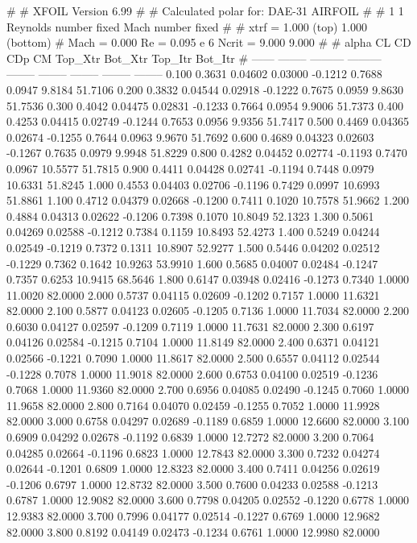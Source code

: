 #  
#       XFOIL         Version 6.99
#  
# Calculated polar for: DAE-31 AIRFOIL                                  
#  
# 1 1 Reynolds number fixed          Mach number fixed         
#  
# xtrf =   1.000 (top)        1.000 (bottom)  
# Mach =   0.000     Re =     0.095 e 6     Ncrit =   9.000  9.000
#  
#   alpha    CL        CD       CDp       CM     Top_Xtr  Bot_Xtr  Top_Itr  Bot_Itr
#  ------ -------- --------- --------- -------- -------- -------- -------- --------
   0.100   0.3631   0.04602   0.03000  -0.1212   0.7688   0.0947   9.8184  51.7106
   0.200   0.3832   0.04544   0.02918  -0.1222   0.7675   0.0959   9.8630  51.7536
   0.300   0.4042   0.04475   0.02831  -0.1233   0.7664   0.0954   9.9006  51.7373
   0.400   0.4253   0.04415   0.02749  -0.1244   0.7653   0.0956   9.9356  51.7417
   0.500   0.4469   0.04365   0.02674  -0.1255   0.7644   0.0963   9.9670  51.7692
   0.600   0.4689   0.04323   0.02603  -0.1267   0.7635   0.0979   9.9948  51.8229
   0.800   0.4282   0.04452   0.02774  -0.1193   0.7470   0.0967  10.5577  51.7815
   0.900   0.4411   0.04428   0.02741  -0.1194   0.7448   0.0979  10.6331  51.8245
   1.000   0.4553   0.04403   0.02706  -0.1196   0.7429   0.0997  10.6993  51.8861
   1.100   0.4712   0.04379   0.02668  -0.1200   0.7411   0.1020  10.7578  51.9662
   1.200   0.4884   0.04313   0.02622  -0.1206   0.7398   0.1070  10.8049  52.1323
   1.300   0.5061   0.04269   0.02588  -0.1212   0.7384   0.1159  10.8493  52.4273
   1.400   0.5249   0.04244   0.02549  -0.1219   0.7372   0.1311  10.8907  52.9277
   1.500   0.5446   0.04202   0.02512  -0.1229   0.7362   0.1642  10.9263  53.9910
   1.600   0.5685   0.04007   0.02484  -0.1247   0.7357   0.6253  10.9415  68.5646
   1.800   0.6147   0.03948   0.02416  -0.1273   0.7340   1.0000  11.0020  82.0000
   2.000   0.5737   0.04115   0.02609  -0.1202   0.7157   1.0000  11.6321  82.0000
   2.100   0.5877   0.04123   0.02605  -0.1205   0.7136   1.0000  11.7034  82.0000
   2.200   0.6030   0.04127   0.02597  -0.1209   0.7119   1.0000  11.7631  82.0000
   2.300   0.6197   0.04126   0.02584  -0.1215   0.7104   1.0000  11.8149  82.0000
   2.400   0.6371   0.04121   0.02566  -0.1221   0.7090   1.0000  11.8617  82.0000
   2.500   0.6557   0.04112   0.02544  -0.1228   0.7078   1.0000  11.9018  82.0000
   2.600   0.6753   0.04100   0.02519  -0.1236   0.7068   1.0000  11.9360  82.0000
   2.700   0.6956   0.04085   0.02490  -0.1245   0.7060   1.0000  11.9658  82.0000
   2.800   0.7164   0.04070   0.02459  -0.1255   0.7052   1.0000  11.9928  82.0000
   3.000   0.6758   0.04297   0.02689  -0.1189   0.6859   1.0000  12.6600  82.0000
   3.100   0.6909   0.04292   0.02678  -0.1192   0.6839   1.0000  12.7272  82.0000
   3.200   0.7064   0.04285   0.02664  -0.1196   0.6823   1.0000  12.7843  82.0000
   3.300   0.7232   0.04274   0.02644  -0.1201   0.6809   1.0000  12.8323  82.0000
   3.400   0.7411   0.04256   0.02619  -0.1206   0.6797   1.0000  12.8732  82.0000
   3.500   0.7600   0.04233   0.02588  -0.1213   0.6787   1.0000  12.9082  82.0000
   3.600   0.7798   0.04205   0.02552  -0.1220   0.6778   1.0000  12.9383  82.0000
   3.700   0.7996   0.04177   0.02514  -0.1227   0.6769   1.0000  12.9682  82.0000
   3.800   0.8192   0.04149   0.02473  -0.1234   0.6761   1.0000  12.9980  82.0000
